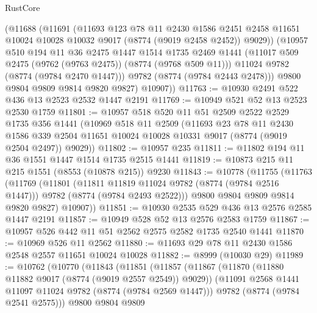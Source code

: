 \begin{lexlean}{RustCore}
\begin{coremodule}
          (@11688
            (@11691
              (@11693
                @123
                @78
                @11
                @2430
                @1586
                @2451
                @2458
                @11651
                @10024
                @10028
                @10032
                @9017
                (@8774 (@9019 @2458 @2452))
                @9029))
            (@10957
              @510
              @194
              @11
              @36
              @2475
              @1447
              @1514
              @1735
              @2469
              @1441
              (@11017 @509 @2475 (@9762 (@9763 @2475)) (@8774 (@9768 @509 @11)))
              @11024
              @9782
              (@8774 (@9784 @2470 @1447)))
            @9782
            (@8774 (@9784 @2443 @2478)))
          @9800
          @9804
          @9809
          @9814
          @9820
          @9827)
        @10907))
@11763 := @10930 @2491 @522 @436 @13 @2523 @2532 @1447 @2191
@11769 := @10949 @521 @52 @13 @2523 @2530 @1759
@11801 := @10957
    @518
    @520
    @11
    @51
    @2509
    @2522
    @2529
    @1735
    @356
    @1441
    (@10969
      @518
      @11
      @2509
      (@11693
        @23
        @78
        @11
        @2430
        @1586
        @339
        @2504
        @11651
        @10024
        @10028
        @10331
        @9017
        (@8774 (@9019 @2504 @2497))
        @9029))
@11802 := @10957 @235
@11811 := @11802 @194 @11 @36 @1551 @1447 @1514 @1735 @2515 @1441
@11819 := @10873 @215 @11 @215 @1551 (@8553 (@10878 @215)) @9230
@11843 := @10778
    (@11755
      (@11763
        (@11769
          (@11801
            (@11811 @11819 @11024 @9782 (@8774 (@9784 @2516 @1447)))
            @9782
            (@8774 (@9784 @2493 @2522)))
          @9800
          @9804
          @9809
          @9814
          @9820
          @9827)
        @10907))
@11851 := @10930 @2535 @529 @436 @13 @2576 @2585 @1447 @2191
@11857 := @10949 @528 @52 @13 @2576 @2583 @1759
@11867 := @10957 @526 @442 @11 @51 @2562 @2575 @2582 @1735 @2540 @1441
@11870 := @10969 @526 @11 @2562
@11880 := @11693 @29 @78 @11 @2430 @1586 @2548 @2557 @11651 @10024 @10028
@11882 := @8999 (@10030 @29)
@11989 := @10762
    (@10770
      (@11843
        (@11851
          (@11857
            (@11867
              (@11870 (@11880 @11882 @9017 (@8774 (@9019 @2557 @2549)) @9029))
              (@11091 @2568 @1441 @11097 @11024 @9782 (@8774 (@9784 @2569 @1447)))
              @9782
              (@8774 (@9784 @2541 @2575)))
            @9800
            @9804
            @9809

\end{coremodule}
\end{lexlean}
